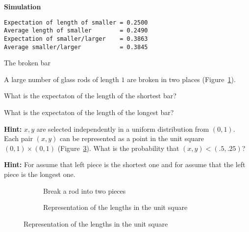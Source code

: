 \textbf{Simulation}
\begin{verbatim}
Expectation of length of smaller = 0.2500
Average length of smaller        = 0.2490
Expectation of smaller/larger    = 0.3863
Average smaller/larger           = 0.3845
\end{verbatim}



\begin{prob}{The broken bar}

A large number of glass rods of length $1$ are broken in two places (Figure~\ref{f.break1}).

 What is the expectaton of the length of the shortest bar?

 What is the expectaton of the length of the longest bar?

\textbf{Hint:} $x,y$ are selected independently in a uniform distribution from $(0,1)$. Each pair $(x,y)$ can be represented as a point in the unit square $(0,1)\times (0,1)$ (Figure~\ref{f.break2}). What is the probability that $(x,y) < (.5,.25)$? 

\textbf{Hint:} For  assume that left piece is the shortest one and for  assume that the left piece is the longest one.
\begin{figure}[tb]
\begin{center}
\begin{subfigure}{.4\textwidth}
\caption{Break a rod into two pieces\hspace{6em}\mbox{}}\label{f.break1}
\end{subfigure}
\hspace{3em}
\begin{subfigure}{.4\textwidth}
\caption{Representation of the lengths in the unit square}\label{f.break2}
\end{subfigure}
\end{center}
\end{figure}
\end{prob}

